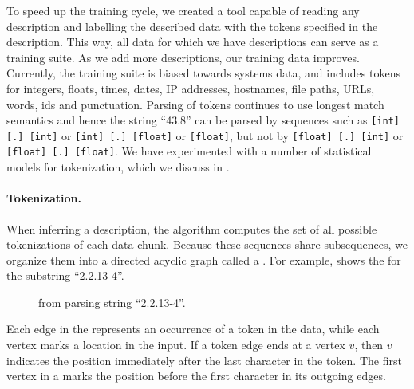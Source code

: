 To speed up the training cycle, we created a tool
capable of reading any \pads{} description and labelling the
described data with the tokens specified in the description.  This way,
all data for which we have \pads{} descriptions can serve as a training
suite. As we add more descriptions, our training data
improves.  Currently, the training suite is biased towards systems 
data, and includes
tokens for integers, floats, times, dates, IP addresses, hostnames, 
file paths, URLs, words, ids and punctuation. 
Parsing of tokens continues to use longest match semantics
and hence the string ``43.8'' can be parsed by sequences such as
{\tt [int] [.] [int]} or {\tt [int] [.] [float]} or {\tt [float]},
but not by {\tt [float] [.] [int]} or {\tt [float] [.] [float]}.
We have experimented with a number of statistical models for
tokenization, which we discuss in .

\paragraph*{Tokenization.}

When inferring a description, the algorithm computes the set of all
possible tokenizations of each data chunk.  Because these sequences
share subsequences, we organize them into a directed acyclic graph
called a \seqset{}.  For example,  shows the \seqset{} for the substring 
``2.2.13-4''. 


\begin{figure}[tb]
\begin{center}
\end{center}
\caption{\seqset{} from parsing string ``2.2.13-4''.}\label{fig:seqset}
\end{figure}

\noindent
Each edge in the \seqset{} represents an occurrence of a token in the
data, while each vertex marks a location in the input.  If a token
edge ends at a vertex $v$, then $v$ indicates the position immediately
after the last character in the token.  The first vertex in a
\seqset{} marks the position before the first character in its
outgoing edges. 

